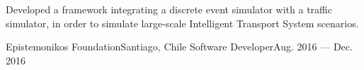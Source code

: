 \documentclass[letterpaper,10pt]{article}
\begin{document}
Developed a framework integrating a discrete event simulator with a traffic simulator, in order to simulate large-scale Intelligent Transport System scenarios.







\resumeSubheading
{Epistemonikos Foundation}{Santiago, Chile}
{Software Developer}{Aug. 2016 --- Dec. 2016}
\end{document}
